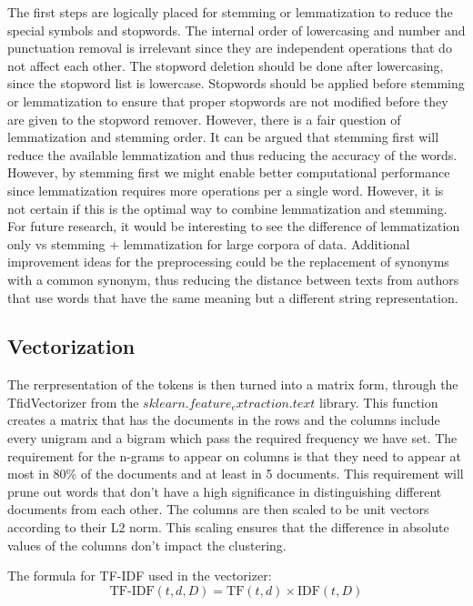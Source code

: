 The first steps are logically placed for stemming or lemmatization to reduce the special symbols and stopwords. The internal order of lowercasing and number and punctuation removal is irrelevant since they are independent operations that do not affect each other. The stopword deletion should be done after lowercasing, since the stopword list is lowercase. Stopwords should be applied before stemming or lemmatization to ensure that proper stopwords are not modified before they are given to the stopword remover. However, there is a fair question of lemmatization and stemming order. It can be argued that stemming first will reduce the available lemmatization and thus reducing the accuracy of the words. However, by stemming first we might enable better computational performance since lemmatization requires more operations per a single word. However, it is not certain if this is the optimal way to combine lemmatization and stemming. For future research, it would be interesting to see the difference of lemmatization only vs stemming + lemmatization for large corpora of data. Additional improvement ideas for the preprocessing could be the replacement of synonyms with a common synonym, thus reducing the distance between texts from authors that use words that have the same meaning but a different string representation.


\subsection{Vectorization}

The rerpresentation of the tokens is then turned into a matrix form, through the TfidVectorizer from the $sklearn.feature_extraction.text$ library. This function creates a matrix that has the documents in the rows and the columns include every unigram and a bigram which pass the required frequency we have set. The requirement for the n-grams to appear on columns is that they need to appear at most in 80\% of the documents and at least in 5 documents. This requirement will prune out words that don't have a high significance in distinguishing different documents from each other. The columns are then scaled to be unit vectors according to their L2 norm. This scaling ensures that the difference in absolute values of the columns don't impact the clustering.



The formula for TF-IDF used in the vectorizer:
\[
    \text{TF-IDF}(t, d, D) = \text{TF}(t, d) \times \text{IDF}(t, D)
\]

